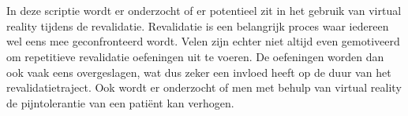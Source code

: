 
%
%

%



\chapter*{}

In deze scriptie wordt er onderzocht of er potentieel zit in het gebruik van virtual reality tijdens de revalidatie. Revalidatie is een belangrijk proces waar iedereen wel eens mee geconfronteerd wordt. Velen zijn echter niet altijd even gemotiveerd om repetitieve revalidatie oefeningen uit te voeren. De oefeningen worden dan ook vaak eens overgeslagen, wat dus zeker een invloed heeft op de duur van het revalidatietraject.
Ook wordt er onderzocht of men met behulp van virtual reality de pijntolerantie van een patiënt kan verhogen.

